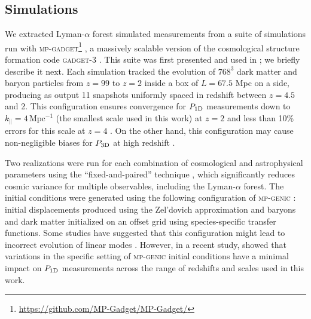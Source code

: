 \documentclass[longauth]{aa}
\newcommand{\lyaf}{Lyman-$\alpha$ forest\xspace}
\newcommand{\poned}{\ensuremath{P_{\rm 1D}}\xspace}
\newcommand{\pthreed}{\ensuremath{P_{\rm 3D}}\xspace}
\newcommand{\iMpc}{\ensuremath{\,\mathrm{Mpc}^{-1}}}
\begin{document}

\subsection{Simulations}
\label{sec:input_sims}

We extracted \lyaf simulated measurements from a suite of simulations run with \textsc{mp-gadget}\footnote{\url{https://github.com/MP-Gadget/MP-Gadget/}} \citep{feng2018MpGadgetMpGadgetTag, emugp_bird2019}, a massively scalable version of the cosmological structure formation code \textsc{gadget-3} \citep[last described in][]{Gadget_Springel}. This suite was first presented and used in \citet{Pedersen2021}; we briefly describe it next. Each simulation tracked the evolution of $768^3$ dark matter and baryon particles from $z=99$ to $z=2$ inside a box of $L = 67.5$ Mpc on a side, producing as output 11 snapshots uniformly spaced in redshift between $z=4.5$ and 2. This configuration ensures convergence for \poned measurements down to $k_\parallel=4\iMpc$ (the smallest scale used in this work) at $z=2$ and less than 10\% errors for this scale at $z=4$ \citep[see][for more details]{bolton2017SherwoodSimulationSuite}. On the other hand, this configuration may cause non-negligible biases for \pthreed at high redshift \citep{hydro_Lukic2015}.

Two realizations were run for each combination of cosmological and astrophysical parameters using the ``fixed-and-paired'' technique \citep{angulo2016CosmologicalNbodySimulations, pontzen2016InvertedInitialConditions}, which significantly reduces cosmic variance for multiple observables, including the \lyaf \citep{fixedpaired_Villaescusa, anderson2019CosmologicalHydrodynamicSimulations}. The initial conditions were generated using the following configuration of \textsc{mp-genic} \citep{Bird2020}: initial displacements produced using the Zel'dovich approximation and baryons and dark matter initialized on an offset grid using species-specific transfer functions. Some studies have suggested that this configuration might lead to incorrect evolution of linear modes \citep{Bird2020}. However, in a recent study, \citet{Khan2024} showed that variations in the specific setting of \textsc{mp-genic} initial conditions have a minimal impact on \poned measurements across the range of redshifts and scales used in this work.
\end{document}
